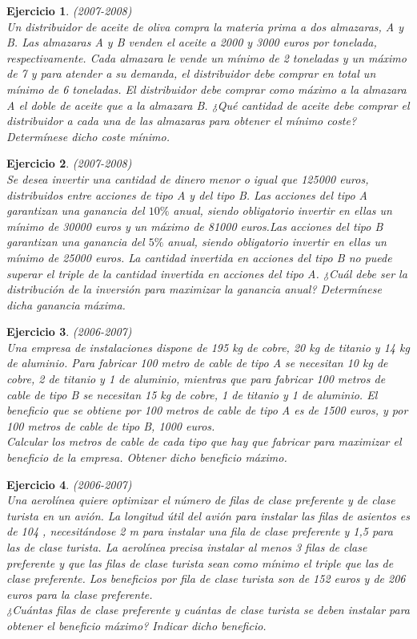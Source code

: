 \documentclass[12pt, a4paper]{amsart}
\newtheorem{ejer}{Ejercicio}
\begin{document}
\begin{ejer}\em  (2007-2008)\\%
Un distribuidor de aceite de oliva compra la materia prima a dos almazaras, A y B. Las almazaras A y B venden el aceite a 2000 y 3000 euros por tonelada, respectivamente. Cada almazara le vende un mínimo de 2 toneladas y un máximo de 7 y para atender a su demanda, el distribuidor debe comprar en total un mínimo de 6 toneladas. El distribuidor debe comprar como máximo a la almazara A el doble de aceite que a la almazara B. ¿Qué cantidad de aceite debe comprar el distribuidor a cada una de las almazaras para obtener el mínimo coste? Determínese dicho coste mínimo.
\end{ejer}

\begin{ejer}\em  (2007-2008)\\%
Se desea invertir una cantidad de dinero menor o igual que 125000 euros, distribuidos entre acciones de tipo A y del tipo B. Las acciones del tipo A garantizan una ganancia del $10\%$ anual, siendo obligatorio invertir en ellas un mínimo de 30000 euros y un máximo de 81000 euros.Las acciones del tipo B garantizan una ganancia del $5\%$ anual, siendo obligatorio invertir en ellas un mínimo de 25000 euros. La cantidad invertida en acciones del tipo B no puede superar el triple de la cantidad invertida en acciones del tipo A. ¿Cuál debe ser la distribución de la inversión para maximizar la ganancia anual? Determínese dicha ganancia máxima.
\end{ejer}


\begin{ejer}\em  (2006-2007)\\%
Una empresa de instalaciones dispone de 195 kg de cobre, 20 kg de titanio y 14 kg de aluminio. Para fabricar 100 metro de cable de tipo A se necesitan 10 kg de cobre, 2 de titanio y 1 de aluminio, mientras que para fabricar 100 metros de cable de tipo B se necesitan 15 kg de cobre, 1 de titanio y 1 de aluminio. El beneficio que se obtiene por 100 metros de cable de tipo A es de 1500 euros, y por 100 metros de cable de tipo B, 1000 euros.\\
Calcular los metros de cable de cada tipo que hay que fabricar para maximizar el beneficio de la empresa. Obtener dicho beneficio máximo.
\end{ejer}

\begin{ejer}\em  (2006-2007)\\%
Una aerolínea quiere optimizar el número de filas de clase preferente y de clase turista en un avión. La longitud útil del avión para instalar las filas de asientos es de 104 , necesitándose 2 m  para instalar una fila de clase preferente y 1,5   para las de clase turista. La aerolínea precisa instalar al menos 3 filas de clase preferente y que las filas de clase turista sean como mínimo el triple que las de clase preferente. Los beneficios por fila de clase turista son de 152 euros y de 206 euros para la clase preferente.\\
¿Cuántas filas de clase preferente y cuántas de clase turista se deben instalar para obtener el beneficio máximo? Indicar dicho beneficio.
\end{ejer}
\end{document}
